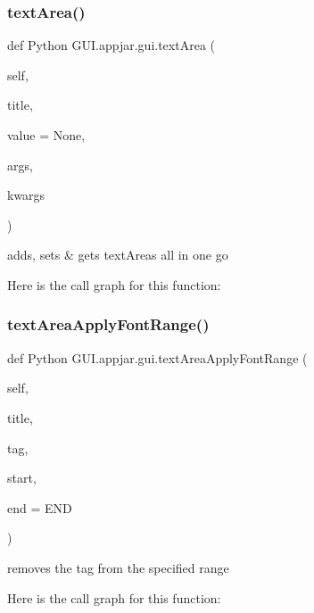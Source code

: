 \begin{DoxyVerb}
\subsubsection{\texorpdfstring{text\+Area()}{textArea()}}
{\footnotesize\ttfamily def Python G\+U\+I.\+appjar.\+gui.\+text\+Area (\begin{DoxyParamCaption}\item[{}]{self,  }\item[{}]{title,  }\item[{}]{value = {\ttfamily None},  }\item[{}]{args,  }\item[{}]{kwargs }\end{DoxyParamCaption})}

\begin{DoxyVerb}adds, sets & gets textAreas all in one go \end{DoxyVerb}
 Here is the call graph for this function\+:
\mbox{\label{class_python_01_g_u_i_1_1appjar_1_1gui_a08b141cc46f5b25c4154308f224d2f5e}} 
\subsubsection{\texorpdfstring{text\+Area\+Apply\+Font\+Range()}{textAreaApplyFontRange()}}
{\footnotesize\ttfamily def Python G\+U\+I.\+appjar.\+gui.\+text\+Area\+Apply\+Font\+Range (\begin{DoxyParamCaption}\item[{}]{self,  }\item[{}]{title,  }\item[{}]{tag,  }\item[{}]{start,  }\item[{}]{end = {\ttfamily END} }\end{DoxyParamCaption})}

\begin{DoxyVerb}removes the tag from the specified range \end{DoxyVerb}
 Here is the call graph for this function\+:
\mbox{\label{class_python_01_g_u_i_1_1appjar_1_1gui_ae873f81d7aa826f80b1fcfba3f7110a5}} 

\end{DoxyVerb}
